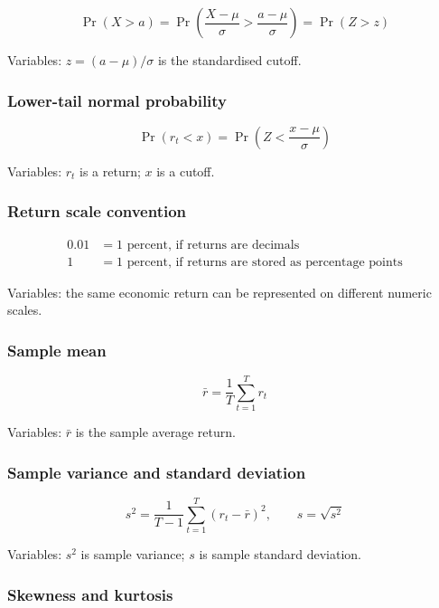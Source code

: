 \documentclass[
  8pt,
  twocolumn]{extarticle}
\begin{document}
\[
\Pr(X>a)=\Pr\left(\frac{X-\mu}{\sigma}>\frac{a-\mu}{\sigma}\right)=\Pr(Z>z)
\]

Variables: \(z=(a-\mu)/\sigma\) is the standardised cutoff.

\subsubsection{Lower-tail normal
probability}\label{lower-tail-normal-probability}

\[
\Pr(r_t<x)=\Pr\left(Z<\frac{x-\mu}{\sigma}\right)
\]

Variables: \(r_t\) is a return; \(x\) is a cutoff.

\subsubsection{Return scale convention}\label{return-scale-convention}

\[
\begin{aligned}
0.01&=1\text{ percent, if returns are decimals}\\
1&=1\text{ percent, if returns are stored as percentage points}
\end{aligned}
\]

Variables: the same economic return can be represented on different
numeric scales.

\subsubsection{Sample mean}\label{sample-mean}

\[
\bar r=\frac{1}{T}\sum_{t=1}^{T}r_t
\]

Variables: \(\bar r\) is the sample average return.

\subsubsection{Sample variance and standard
deviation}\label{sample-variance-and-standard-deviation}

\[
s^2=\frac{1}{T-1}\sum_{t=1}^{T}(r_t-\bar r)^2,\qquad s=\sqrt{s^2}
\]

Variables: \(s^2\) is sample variance; \(s\) is sample standard
deviation.

\subsubsection{Skewness and kurtosis}\label{skewness-and-kurtosis}
\end{document}
